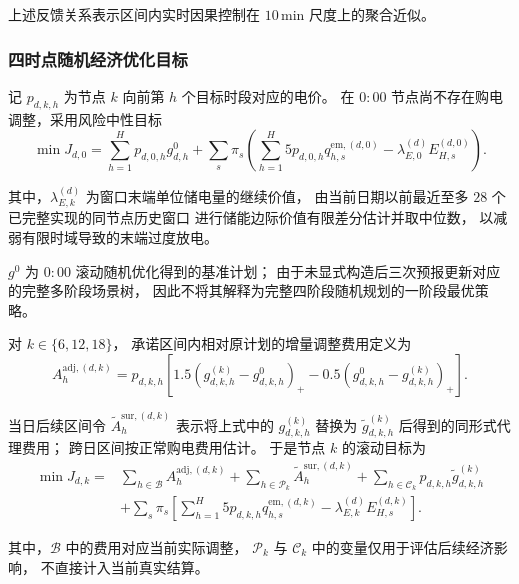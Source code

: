 \documentclass[zihao=-4,a4paper,UTF8,fontset=none]{ctexart}
\begin{document}
上述反馈关系表示区间内实时因果控制在 $10\,\mathrm{min}$ 尺度上的聚合近似。


\subsubsection{四时点随机经济优化目标}

记 $p_{d,k,h}$ 为节点 $k$ 向前第 $h$ 个目标时段对应的电价。
在 $0{:}00$ 节点尚不存在购电调整，采用风险中性目标
\begin{equation}
\min J_{d,0}
=
\sum_{h=1}^{H} p_{d,0,h}g_{d,h}^{0}
+
\sum_s \pi_s
\left(
\sum_{h=1}^{H} 5p_{d,0,h}q_{h,s}^{\mathrm{em},(d,0)}
-
\lambda_{E,0}^{(d)}E_{H,s}^{(d,0)}
\right).
\label{eq:q3_objective_0}
\end{equation}

其中，$\lambda_{E,k}^{(d)}$ 为窗口末端单位储电量的继续价值，
由当前日期以前最近至多 $28$ 个已完整实现的同节点历史窗口
进行储能边际价值有限差分估计并取中位数，
以减弱有限时域导致的末端过度放电。

$g^0$ 为 $0{:}00$ 滚动随机优化得到的基准计划；
由于未显式构造后三次预报更新对应的完整多阶段场景树，
因此不将其解释为完整四阶段随机规划的一阶段最优策略。

对 $k\in\{6,12,18\}$，
承诺区间内相对原计划的增量调整费用定义为
\begin{equation}
A_h^{\mathrm{adj},(d,k)}
=
p_{d,k,h}
\left[
1.5
\left(
g_{d,k,h}^{(k)}
-
g_{d,k,h}^{0}
\right)_+
-
0.5
\left(
g_{d,k,h}^{0}
-
g_{d,k,h}^{(k)}
\right)_+
\right].
\label{eq:q3_adjustment_cost}
\end{equation}

当日后续区间令
$\widetilde A_h^{\mathrm{sur},(d,k)}$
表示将上式中的 $g_{d,k,h}^{(k)}$
替换为 $\widetilde g_{d,k,h}^{(k)}$
后得到的同形式代理费用；
跨日区间按正常购电费用估计。
于是节点 $k$ 的滚动目标为
\begin{equation}
\begin{aligned}
\min J_{d,k}
={}&
\sum_{h\in\mathcal B}
A_h^{\mathrm{adj},(d,k)}
+
\sum_{h\in\mathcal P_k}
\widetilde A_h^{\mathrm{sur},(d,k)}
+
\sum_{h\in\mathcal C_k}
p_{d,k,h}
\widetilde g_{d,k,h}^{(k)}
\\
&+
\sum_s\pi_s
\left[
\sum_{h=1}^{H}
5p_{d,k,h}
q_{h,s}^{\mathrm{em},(d,k)}
-
\lambda_{E,k}^{(d)}
E_{H,s}^{(d,k)}
\right].
\end{aligned}
\label{eq:q3_objective_k}
\end{equation}

其中，$\mathcal B$ 中的费用对应当前实际调整，
$\mathcal P_k$ 与 $\mathcal C_k$ 中的变量仅用于评估后续经济影响，
不直接计入当前真实结算。
\end{document}

